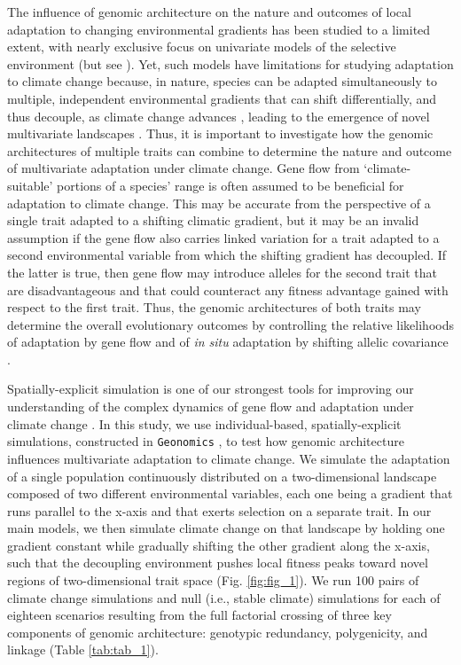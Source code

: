 \documentclass[9pt,twocolumn,twoside,lineno]{new_article}
\begin{document}
The influence of genomic architecture on the nature and outcomes
of local adaptation to changing environmental gradients
has been studied to a limited extent,
with nearly exclusive focus on univariate models
of the selective environment (but see \cite{schiffers}).
Yet, such models have limitations for studying adaptation to climate change
because, in nature, species can be adapted simultaneously to multiple,
independent environmental gradients \cite{guillaume} that can shift differentially,
and thus decouple, as climate change advances
\cite{crimmins,daly},
leading to the emergence of novel multivariate landscapes
\cite{williams_novel_climates,williams_projected_novel_disappearing,fitzpatrick}.
Thus, it is important to investigate how the genomic architectures
of multiple traits can combine to determine the nature and outcome
of multivariate adaptation under climate change.
Gene flow from `climate-suitable' portions of a species' range
is often assumed to be beneficial for adaptation to climate change.
This may be accurate from the perspective of a single trait
adapted to a shifting climatic gradient, but it may be
an invalid assumption if the gene flow also carries
linked variation for a trait
adapted to a second environmental variable
from which the shifting gradient has decoupled.
If the latter is true,
then gene flow may introduce alleles for the second trait
that are disadvantageous and that could counteract any fitness advantage
gained with respect to the first trait.
Thus, the genomic architectures of both traits
may determine the overall evolutionary outcomes
by controlling the relative likelihoods of adaptation by gene flow
and of \textit{in situ} adaptation by shifting
allelic covariance
\cite{aitken_whitlock,schiffers}.

Spatially-explicit simulation is one of our strongest tools
for improving our understanding of the complex dynamics of gene flow and adaptation
under climate change \cite{capblancq_review}.
In this study, we use individual-based, spatially-explicit simulations,
constructed in \texttt{Geonomics} \cite{terasaki_hart},
to test how genomic architecture influences multivariate adaptation to climate change.
We simulate the adaptation of a single population
continuously distributed on a two-dimensional landscape composed of two different environmental
variables, each one being a gradient that runs parallel to the x-axis and that exerts selection on a separate trait.
In our main models, we then simulate climate change on that landscape by holding one gradient 
constant while gradually shifting the other gradient along the x-axis, such that
the decoupling environment pushes local fitness peaks toward novel regions 
of two-dimensional trait space (Fig. \ref{fig:fig_1}).
We run 100 pairs of climate change simulations
and null (i.e., stable climate) simulations for each of eighteen scenarios
resulting from the full factorial crossing of three key components
of genomic architecture: genotypic redundancy, polygenicity, and linkage
(Table \ref{tab:tab_1}).
\end{document}
